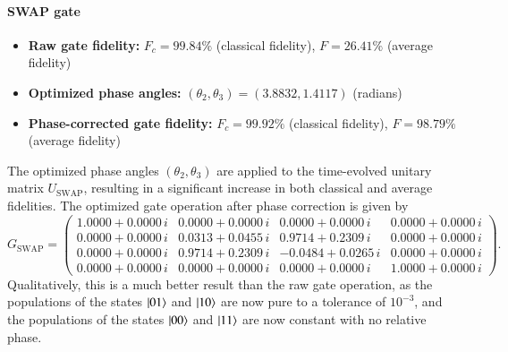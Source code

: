 \documentclass{subfiles}
\begin{document}
\paragraph{SWAP gate}
\begin{itemize}
    \item \textbf{Raw gate fidelity:} $F_c = 99.84\%$ (classical fidelity), $F = 26.41\%$ (average fidelity)
    \item \textbf{Optimized phase angles:} $(\theta_2, \theta_3) = (3.8832, 1.4117)$ (radians)
    \item \textbf{Phase-corrected gate fidelity:} $F_c = 99.92\%$ (classical fidelity), $F = 98.79\%$ (average fidelity)
\end{itemize}
The optimized phase angles $(\theta_2, \theta_3)$ are applied to the time-evolved unitary matrix $U_{\text{SWAP}}$, resulting in a significant increase in both classical and average fidelities. 
The optimized gate operation after phase correction is given by
\begin{equation}
G_{\mathrm{SWAP}}
=
\begin{pmatrix}
 1.0000 + 0.0000\,i & 0.0000 + 0.0000\,i & 0.0000 + 0.0000\,i & 0.0000 + 0.0000\,i\\
 0.0000 + 0.0000\,i & 0.0313 + 0.0455\,i & 0.9714 + 0.2309\,i & 0.0000 + 0.0000\,i\\
 0.0000 + 0.0000\,i & 0.9714 + 0.2309\,i & -0.0484 + 0.0265\,i & 0.0000 + 0.0000\,i\\
 0.0000 + 0.0000\,i & 0.0000 + 0.0000\,i & 0.0000 + 0.0000\,i & 1.0000 + 0.0000\,i
\end{pmatrix}.
\end{equation}
Qualitatively, this is a much better result than the raw gate operation, as the populations of the states $\ket{01}$ and $\ket{10}$ are now pure to a tolerance of $10^{-3}$, and the populations of the states $\ket{00}$ and $\ket{11}$ are now constant with no relative phase. 
\end{document}
